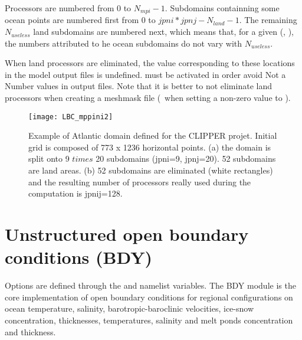 \documentclass[../main/NEMO_manual]{subfiles}
\begin{document}
Processors are numbered from 0 to $N_{mpi} - 1$. Subdomains containning some ocean points are numbered first from 0 to $jpni * jpnj - N_{land} -1$. The remaining $N_{useless}$ land subdomains are numbered next, which means that, for a given (, ), the numbers attributed to he ocean subdomains do not vary with $N_{useless}$.

When land processors are eliminated, the value corresponding to these locations in the model output files is undefined.  must be activated in order avoid Not a Number values in output files. Note that it is better to not eliminate land processors when creating a meshmask file (\ie\ when setting a non-zero value to ).

\begin{figure}[!ht]
  \centering
  \texttt{[image: LBC\_mppini2]}
  \caption[Atlantic domain defined for the CLIPPER projet]{
    Example of Atlantic domain defined for the CLIPPER projet.
    Initial grid is composed of 773 x 1236 horizontal points.
    (a) the domain is split onto 9 $times$ 20 subdomains (jpni=9, jpnj=20).
    52 subdomains are land areas.
    (b) 52 subdomains are eliminated (white rectangles) and
    the resulting number of processors really used during the computation is jpnij=128.}
  \label{fig:LBC_mppini2}
\end{figure}

\section{Unstructured open boundary conditions (BDY)}
\label{sec:LBC_bdy}

\begin{listing}
  \caption{}
  \label{lst:nambdy}
\end{listing}

\begin{listing}
  \caption{}
  \label{lst:nambdy_dta}
\end{listing}

Options are defined through the  and  namelist variables.
The BDY module is the core implementation of open boundary conditions for regional configurations on
ocean temperature, salinity, barotropic-baroclinic velocities, ice-snow concentration, thicknesses, temperatures, salinity and melt ponds concentration and thickness.
\end{document}
